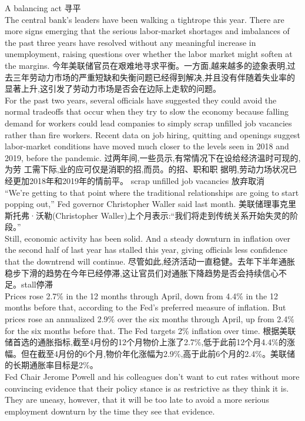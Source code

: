 \documentclass[a4paper,12pt]{article}
\begin{document}
A balancing act 寻平 
\\The central bank's leaders have been walking a tightrope this year. There are more signs emerging that the serious labor-market shortages and imbalances of the past three years have resolved without any meaningful increase in unemployment, raising questions over whether the labor market might soften at the margins. 今年美联储官员在艰难地寻求平衡。一方面,越来越多的迹象表明,过去三年劳动力市场的严重短缺和失衡问题已经得到解决,并且没有伴随着失业率的显著上升,这引发了劳动力市场是否会在边际上走软的问题。
\\For the past two years, several officials have suggested they could avoid the normal tradeoffs that occur when they try to slow the economy because falling demand for workers could lead companies to simply scrap unfilled job vacancies rather than fire workers. Recent data on job hiring, quitting and openings suggest labor-market conditions have moved much closer to the levels seen in 2018 and 2019, before the pandemic. 过两年间,⼀些员⽰,有常情况下在设给经济温时可现的,为劳 ⼯需下际,业的应可仅是消职的招,⽽员。的招、职和职 据明,劳动⼒场状况已经更加2018年和2019年的情前平。 scrap unfilled job vacancies 放弃取消
\\“We're getting to that point where the traditional relationships are going to start popping out,” Fed governor Christopher Waller said last month. 美联储理事克里斯托弗·沃勒(Christopher Waller)上个月表示:“我们将走到传统关系开始失灵的阶段。”
\\Still, economic activity has been solid. And a steady downturn in inflation over the second half of last year has stalled this year, giving officials less confidence that the downtrend will continue. 
尽管如此,经济活动一直稳健。去年下半年通胀稳步下滑的趋势在今年已经停滞,这让官员们对通胀下降趋势是否会持续信心不足。stall停滞
\\Prices rose 2.7\% in the 12 months through April, down from 4.4\% in the 12 months before that, according to the Fed's preferred measure of inflation. But prices rose an annualized 2.9\% over the six months through April, up from 2.4\% for the six months before that. The Fed targets 2\% inflation over time. 根据美联储首选的通胀指标,截至4月份的12个月物价上涨了2.7\%,低于此前12个月4.4\%的涨幅。但在截至4月份的6个月,物价年化涨幅为2.9\%,高于此前6个月的2.4\%。美联储的长期通胀率目标是2\%。
\\Fed Chair Jerome Powell and his colleagues don't want to cut rates without more convincing evidence that their policy stance is as restrictive as they think it is. They are uneasy, however, that it will be too late to avoid a more serious employment downturn by the time they see that evidence. 
\end{document}
